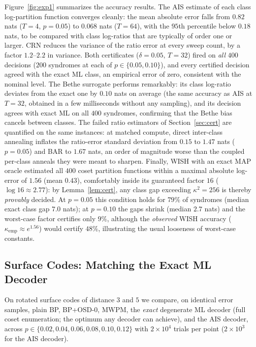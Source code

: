 \documentclass[a4paper,11pt]{quantumarticle}
\theoremstyle{definition}
\begin{document}
Figure~\ref{fig:exp1} summarizes the accuracy results. The AIS estimate of
each class log-partition function converges cleanly: the mean absolute
error falls from $0.82$ nats ($T=4$, $p=0.05$) to $0.068$ nats ($T=64$),
with the $95$th percentile below $0.18$ nats, to be compared with class
log-ratios that are typically of order one or larger. CRN reduces the
variance of the ratio error at every sweep count, by a factor
$1.2$--$2.2$ in variance. Both certificates ($\delta=0.05$, $T=32$)
fired on \emph{all} $400$ decisions ($200$ syndromes at each of
$p\in\{0.05,0.10\}$), and every certified decision agreed with the exact ML
class, an empirical error of zero, consistent with the nominal level.
The Bethe surrogate performs remarkably: its class log-ratio deviates from
the exact one by $0.10$ nats on average (the same accuracy as AIS at
$T=32$, obtained in a few milliseconds without any sampling), and its
decision agrees with exact ML on all $400$ syndromes, confirming that the
Bethe bias cancels between classes. The failed ratio estimators of
Section~\ref{sec:cert} are quantified on the same instances: at matched
compute, direct inter-class annealing inflates the ratio-error standard
deviation from $0.15$ to $1.47$ nats ($p=0.05$) and BAR to $1.67$
nats, an order of magnitude worse than the coupled per-class anneals they
were meant to sharpen.
Finally, WISH with an exact MAP oracle estimated all $400$ coset partition
functions within a maximal absolute log-error of $1.56$ (mean $0.43$),
comfortably inside its guaranteed factor $16$ ($\log 16\approx2.77$): by
Lemma~\ref{lem:cert}, any class gap exceeding $\kappa^2=256$ is thereby
\emph{provably} decided. At $p=0.05$ this condition holds for $79\%$ of
syndromes (median exact class gap $7.0$ nats); at $p=0.10$ the gaps shrink
(median $2.7$ nats) and the worst-case factor certifies only $9\%$,
although the \emph{observed} WISH accuracy ($\kappa_{\mathrm{emp}}\approx
e^{1.56}$) would certify $48\%$, illustrating the usual looseness of
worst-case constants.

\subsection{Surface Codes: Matching the Exact ML Decoder}
\label{sec:exp2}
On rotated surface codes of distance $3$ and $5$ we compare, on identical
error samples, plain BP, BP+OSD-0, MWPM, the \emph{exact} degenerate ML
decoder (full coset enumeration; the optimum any decoder can achieve), and
the AIS decoder, across
$p\in\{0.02,0.04,0.06,0.08,0.10,0.12\}$ with $2\times10^4$ trials per point
($2\times10^3$ for the AIS decoder).
\end{document}
